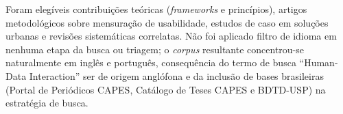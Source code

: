 \documentclass[12pt]{article}
\begin{document}
    Foram elegíveis contribuições teóricas (\textit{frameworks} e princípios), artigos metodológicos sobre mensuração de usabilidade, estudos de caso em soluções urbanas e revisões sistemáticas correlatas. Não foi aplicado filtro de idioma em nenhuma etapa da busca ou triagem; o \textit{corpus} resultante concentrou-se naturalmente em inglês e português, consequência do termo de busca ``Human-Data Interaction'' ser de origem anglófona e da inclusão de bases brasileiras (Portal de Periódicos CAPES, Catálogo de Teses CAPES e BDTD-USP) na estratégia de busca.
    
\end{document}
